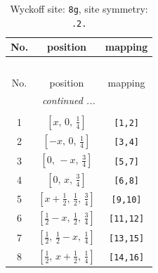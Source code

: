 \documentclass[fleqn,8pt]{jsarticle}
\begin{document}
\renewcommand{\arraystretch}{1.2}
\begin{longtable}{ccc}
\caption{Wyckoff site: {\tt 8g}, site symmetry: {\tt .2.}}
 \\
 \hline \hline
No. & position & mapping \\ \hline \endfirsthead

\multicolumn{2}{l}{\tablename\ \thetable{}} \\
 \hline \hline
No. & position & mapping \\ \hline \endhead

 \hline \hline
\multicolumn{2}{r}{\footnotesize\it continued ...} \\ \endfoot

 \hline \hline
\multicolumn{2}{r}{} \\ \endlastfoot

1 & $\left[ x,\, 0,\, \frac{1}{4} \right]$ & {\tt [1,2]} \\ \hline
2 & $\left[ - x,\, 0,\, \frac{1}{4} \right]$ & {\tt [3,4]} \\ \hline
3 & $\left[ 0,\, - x,\, \frac{3}{4} \right]$ & {\tt [5,7]} \\ \hline
4 & $\left[ 0,\, x,\, \frac{3}{4} \right]$ & {\tt [6,8]} \\ \hline
5 & $\left[ x + \frac{1}{2},\, \frac{1}{2},\, \frac{3}{4} \right]$ & {\tt [9,10]} \\ \hline
6 & $\left[ \frac{1}{2} - x,\, \frac{1}{2},\, \frac{3}{4} \right]$ & {\tt [11,12]} \\ \hline
7 & $\left[ \frac{1}{2},\, \frac{1}{2} - x,\, \frac{1}{4} \right]$ & {\tt [13,15]} \\ \hline
8 & $\left[ \frac{1}{2},\, x + \frac{1}{2},\, \frac{1}{4} \right]$ & {\tt [14,16]} \\
\end{longtable}
\renewcommand{\arraystretch}{1.2}
\end{document}
